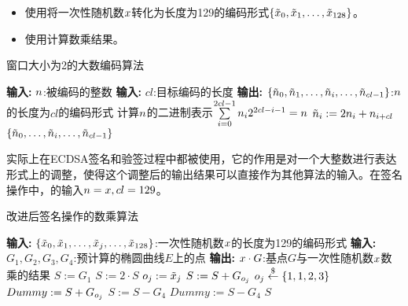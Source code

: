 {	\begin{itemize}
		\item 使用将一次性随机数$x$转化为长度为129的编码形式$\left\{\tilde{x}_0,\tilde{x}_1,\dots,\tilde{x}_{128}\right\}$。
		\item 使用计算数乘结果。
	\end{itemize}
	
	\begin{breakablealgorithm}
		\caption{窗口大小为2的大数编码算法}\label{alg:encodek}
		\begin{algorithmic}[1]
			\Statex \textbf{输入:} $n$:被编码的整数
			\Statex \textbf{输入:} $cl$:目标编码的长度
			\Statex \textbf{输出:} $\left\{\tilde{n}_0,\tilde{n}_1,\dots,\tilde{n}_i,\dots, \tilde{n}_{cl-1}\right\}$:$n$的长度为$cl$的编码形式
			\State 计算$n$的二进制表示$\sum\limits_{i=0}^{2cl-1}n_i2^{2cl-i-1}=n$
			\State $\tilde {n}_i:=2n_i+n_{i+cl}$
			\EndFor
			\State \Return $\left\{\tilde{n}_0,\dots,\tilde{n}_i,\dots, \tilde{n}_{cl-1}\right\}$
		\end{algorithmic}
	\end{breakablealgorithm}

	实际上在ECDSA签名和验签过程中都被使用，它的作用是对一个大整数进行表达形式上的调整，使得这个调整后的输出结果可以直接作为其他算法的输入。在签名操作中，的输入$n=x,cl=129$。

	\begin{algorithm}[!h]
		\caption{改进后签名操作的数乘算法}\label{alg:improvesignscalar}
		\begin{algorithmic}[1]
			\Statex \textbf{输入:} $\left\{\tilde{x}_0,\tilde{x}_1,\dots,\tilde{x}_j,\dots, \tilde{x}_{128}\right\}$:一次性随机数$x$的长度为129的编码形式
			\Statex \textbf{输入:} $G_1,G_2,G_3,G_4$:预计算的椭圆曲线$E$上的点
			\Statex \textbf{输出:} $x\cdot G$:基点$G$与一次性随机数$x$数乘的结果
			\State $S:=G_1$
			\State $S:=2\cdot S$
			\State $o_j:=\tilde {x}_j$
			\State $S:=S+G_{o_j}$
			\Else
			\State $o_j\stackrel{\$}\gets\{1,1,2,3\}$
			\State $Dummy:=S+G_{o_j}$
			\EndIf
			\EndFor
			\State $S:=S-G_4$
			\Else
			\State $Dummy:=S-G_4$
			\EndIf
			\State \Return $S$
		\end{algorithmic}
	\end{algorithm}

}

